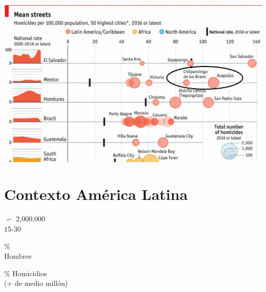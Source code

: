 \documentclass[xcolor={dvipsnames}]{beamer}
\begin{document}
\begin{frame}
\Large{
				\begin{center}
\includegraphics[scale=.4]{Figures/Capture}
				\end{center}				
}
\end{frame}

\section{Contexto Am\'erica Latina}

\begin{frame}
\Huge{
\begin{center}
{\fontsize{70}{80}\selectfont $\backsim$ 2,000,000}\\
15-30

\end{center}
}
\end{frame}

\begin{frame}
\Huge{
\begin{center}
{\fontsize{70}{80}\%}\\
Hombres

\end{center}
}
\end{frame}


\begin{frame}
\Huge{
\begin{center}
{\fontsize{70}{80}\% Homicidios}\\
(+ de medio mill\'on)

\end{center}
}
\end{frame}
\end{document}
